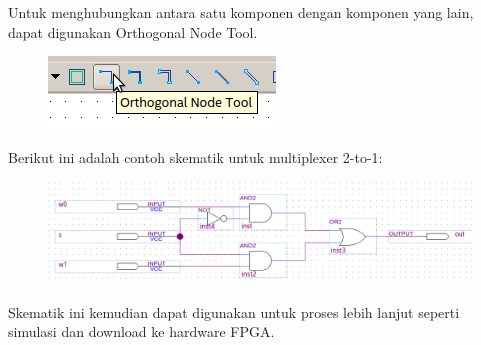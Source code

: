 Untuk menghubungkan antara satu komponen dengan komponen yang lain, dapat
digunakan {\sf Orthogonal Node Tool}.
\begin{figure}[H]
\centering
\includegraphics[scale=0.5]{images/OrthogonalNodeTool.png}
\par
\end{figure}

Berikut ini adalah contoh skematik untuk multiplexer 2-to-1:
\begin{figure}[H]
\centering
\includegraphics[width=\textwidth]{images/sch_mux_2_1.png}
\par
\end{figure}

Skematik ini kemudian dapat digunakan untuk proses lebih lanjut seperti
simulasi dan download ke hardware FPGA.
